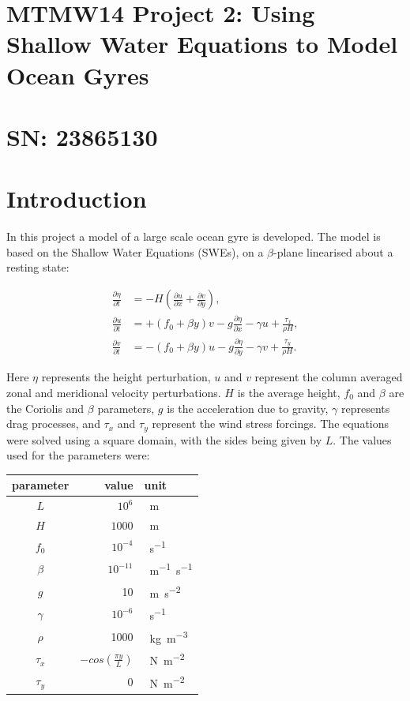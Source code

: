 \documentclass{article}
\begin{document}
\section*{MTMW14 Project 2: Using Shallow Water Equations to Model Ocean Gyres}

\section*{SN: 23865130}

\section*{Introduction}

In this project a model of a large scale ocean gyre is developed. The model is based on the Shallow
Water Equations (SWEs), on a $\beta$-plane linearised about a resting state:

\begin{align}
    \label{eqn:swe1} 
    \frac{\partial \eta}{\partial t} & =  - H (\frac{\partial u}{\partial x} + \frac{\partial v}{\partial y} ),  \\
    \label{eqn:swe2} 
    \frac{\partial u}{\partial t} & =  + (f_0 + \beta y) v - g \frac{\partial \eta}{\partial x} - \gamma u + \frac{\tau_x}{\rho H}, \\
    \label{eqn:swe3} 
    \frac{\partial v}{\partial t} & =  - (f_0 + \beta y) u - g \frac{\partial \eta}{\partial y} - \gamma v + \frac{\tau_y}{\rho H}.
\end{align}

Here $\eta$ represents the height perturbation, $u$ and $v$ represent the column averaged zonal and meridional
velocity perturbations. $H$ is the average height, $f_0$ and $\beta$ are the Coriolis and $\beta$
parameters, $g$ is the acceleration due to gravity, $\gamma$ represents drag processes, and $\tau_x$
and $\tau_y$ represent the wind stress forcings. The equations were solved using a square domain,
with the sides being given by $L$.  The values used for the parameters were: 

\begin{center}
    \begin{tabular}{ c|r l } 
	parameter & value & unit \\ 
	\hline
	$L$ & $10^6$ & \SI{}{m} \\
	$H$ & $1000$ & \SI{}{m} \\ 
	$f_0$ & $10^{-4}$ & \SI{}{s^{-1}} \\ 
	$\beta$ & $10^{-11}$ & \SI{}{m^{-1} s^{-1}} \\ 
	$g$ & 10 & \SI{}{m s^{-2}} \\ 
	$\gamma$ & $10^{-6}$ & \SI{}{s^{-1}} \\ 
	$\rho$ & 1000 & \SI{}{kg m^{-3}} \\ 
	$\tau_x$ & $-cos(\frac{\pi y}{L})$ & \SI{}{N m^{-2}} \\ 
	$\tau_y$ & 0 & \SI{}{N m^{-2}}  \\ 
    \end{tabular}
\end{center}
\end{document}
